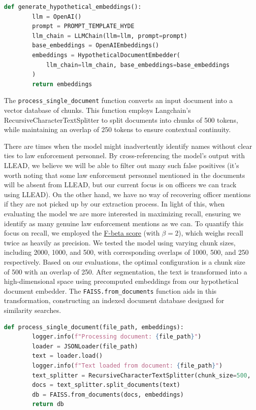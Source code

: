 \documentclass{article}
\begin{document}
\begin{lstlisting}[language=Python, caption=Code Snippet 3, breaklines=true]
    def generate_hypothetical_embeddings():
        llm = OpenAI()
        prompt = PROMPT_TEMPLATE_HYDE
        llm_chain = LLMChain(llm=llm, prompt=prompt)
        base_embeddings = OpenAIEmbeddings()
        embeddings = HypotheticalDocumentEmbedder(
            llm_chain=llm_chain, base_embeddings=base_embeddings
        )
        return embeddings
\end{lstlisting}

The \texttt{process\_single\_document} function converts an input document into a vector database of chunks. This function employs Langchain's RecursiveCharacterTextSplitter to split documents into chunks of 500 tokens, while maintaining an overlap of 250 tokens to ensure contextual continuity.

There are times when the model might inadvertently identify names without clear ties to law enforcement personnel. By cross-referencing the model's output with LLEAD, we believe we will be able to filter out many such false positives (it's worth noting that some law enforcement personnel mentioned in the documents will be absent from LLEAD, but our current focus is on officers we can track using LLEAD). On the other hand, we have no way of recovering officer mentions if they are not picked up by our extraction process. In light of this, when evaluating the model we are more interested in maximizing recall, ensuring we identify as many genuine law enforcement mentions as we can.  To quantify this focus on recall, we employed the \href{https://en.wikipedia.org/wiki/F-score#F%CE%B2\_score}{F-beta score} (with $\beta=2$), which weighs recall twice as heavily as precision. We tested the model using varying chunk sizes, including 2000, 1000, and 500, with corresponding overlaps of 1000, 500, and 250 respectively. Based on our evaluations, the optimal configuration is a chunk size of 500 with an overlap of 250. After segmentation, the text is transformed into a high-dimensional space using precomputed embeddings from our hypothetical document embedder. The \texttt{FAISS.from\_documents} function aids in this transformation, constructing an indexed document database designed for similarity searches.

\begin{lstlisting}[language=Python, caption=Code Snippet 4, breaklines=true]
    def process_single_document(file_path, embeddings):
        logger.info(f"Processing document: {file_path}")
        loader = JSONLoader(file_path)
        text = loader.load()
        logger.info(f"Text loaded from document: {file_path}")
        text_splitter = RecursiveCharacterTextSplitter(chunk_size=500, chunk_overlap=250)
        docs = text_splitter.split_documents(text)
        db = FAISS.from_documents(docs, embeddings)
        return db
\end{lstlisting}
\end{document}
